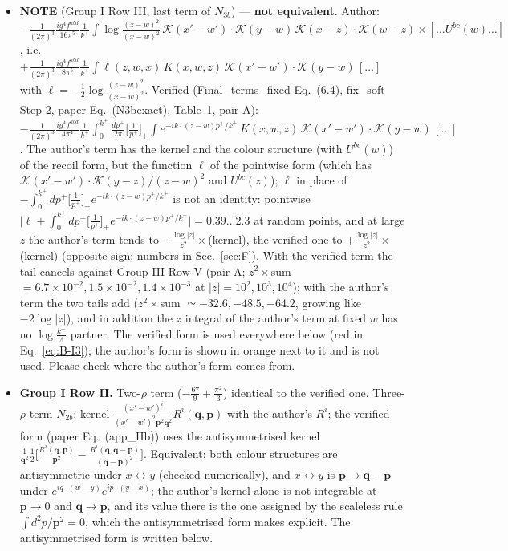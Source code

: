 \begin{itemize}
\item[A2] {\color{red}\textbf{NOTE} (Group I Row III, last term of $N_{3b}$) --- \textbf{not equivalent}. Author: $-\frac{1}{(2\pi)^{3}}\frac{ig^{4}f^{abd}}{16\pi^{5}}\frac{1}{k^{+}}\int\log\frac{(z-w)^{2}}{(x-w)^{2}}\,\mathcal{K}(x'-w')\cdot\mathcal{K}(y-w)\,\mathcal{K}(x-z)\cdot\mathcal{K}(w-z)\times[\dots U^{bc}(w)\dots]$, i.e.\ $+\frac{1}{(2\pi)^{3}}\frac{ig^{4}f^{abd}}{8\pi^{5}}\frac{1}{k^{+}}\int\ell(z,w,x)\,K(x,w,z)\,\mathcal{K}(x'-w')\cdot\mathcal{K}(y-w)\,[\dots]$ with $\ell=-\frac12\log\frac{(z-w)^{2}}{(x-w)^{2}}$. Verified (Final\_terms\_fixed Eq.~(6.4), fix\_soft Step 2, paper Eq.~(N3bexact), Table~1, pair A): $-\frac{1}{(2\pi)^{3}}\frac{ig^{4}f^{abd}}{4\pi^{4}}\frac{1}{k^{+}}\int_{0}^{k^{+}}\frac{dp^{+}}{2\pi}\big[\frac{1}{p^{+}}\big]_{+}\int e^{-ik\cdot(z-w)p^{+}/k^{+}}\,K(x,w,z)\,\mathcal{K}(x'-w')\cdot\mathcal{K}(y-w)\,[\dots]$. The author's term has the kernel and the colour structure (with $U^{bc}(w)$) of the recoil form, but the function $\ell$ of the pointwise form (which has $\mathcal{K}(x'-w')\cdot\mathcal{K}(y-z)/(z-w)^{2}$ and $U^{bc}(z)$); $\ell$ in place of $-\int_{0}^{k^{+}}dp^{+}\big[\frac{1}{p^{+}}\big]_{+}e^{-ik\cdot(z-w)p^{+}/k^{+}}$ is not an identity: pointwise $\big|\ell+\int_{0}^{k^{+}}dp^{+}\big[\frac{1}{p^{+}}\big]_{+}e^{-ik\cdot(z-w)p^{+}/k^{+}}\big|=0.39\dots2.3$ at random points, and at large $z$ the author's term tends to $-\frac{\log|z|}{z^{2}}\times$(kernel), the verified one to $+\frac{\log|z|}{z^{2}}\times$(kernel) (opposite sign; numbers in Sec.~\ref{sec:F}). With the verified term the tail cancels against Group III Row V (pair A; $z^{2}\times$sum $=6.7\times10^{-2},1.5\times10^{-2},1.4\times10^{-3}$ at $|z|=10^{2},10^{3},10^{4}$); with the author's term the two tails add ($z^{2}\times$sum $\simeq-32.6,-48.5,-64.2$, growing like $-2\log|z|$), and in addition the $z$ integral of the author's term at fixed $w$ has no $\log\frac{k^{+}}{\Lambda}$ partner. The verified form is used everywhere below (red in Eq.~\eqref{eq:B-I3}); the author's form is shown in orange next to it and is not used. Please check where the author's form comes from.}
\item[A3] \textbf{Group I Row II.} Two-$\rho$ term ($-\frac{67}{9}+\frac{\pi^{2}}{3}$) identical to the verified one. Three-$\rho$ term $N_{2b}$: kernel $\frac{(x'-w')^{i}}{(x'-w')^{2}\mathbf{p}^{2}\mathbf{q}^{2}}R^{i}(\mathbf{q},\mathbf{p})$ with the author's $R^{i}$; the verified form (paper Eq.~(app\_IIb)) uses the antisymmetrised kernel $\frac{1}{\mathbf{q}^{2}}\frac12\big[\frac{R^{i}(\mathbf{q},\mathbf{p})}{\mathbf{p}^{2}}-\frac{R^{i}(\mathbf{q},\mathbf{q}-\mathbf{p})}{(\mathbf{q}-\mathbf{p})^{2}}\big]$. Equivalent: both colour structures are antisymmetric under $x\leftrightarrow y$ (checked numerically), and $x\leftrightarrow y$ is $\mathbf{p}\to\mathbf{q}-\mathbf{p}$ under $e^{iq\cdot(w-y)}e^{ip\cdot(y-x)}$; the author's kernel alone is not integrable at $\mathbf{p}\to0$ and $\mathbf{q}\to\mathbf{p}$, and its value there is the one assigned by the scaleless rule $\int d^{2}p/\mathbf{p}^{2}=0$, which the antisymmetrised form makes explicit. The antisymmetrised form is written below.

\end{itemize}
